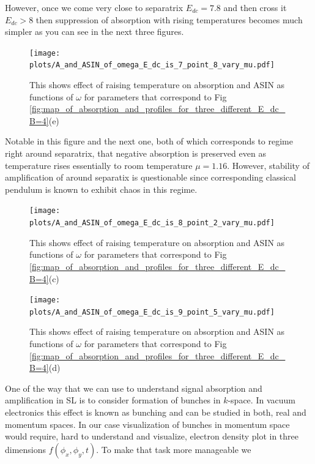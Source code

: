 \documentclass[40pt,letterpaper,physrev]{article}
\begin{document}
    However, once we come very close to separatrix $E_{dc} = 7.8$ and then cross it $E_{dc} > 8$ then suppression of
    absorption with rising temperatures becomes much simpler as you can see in the next three figures.
	\begin{figure}[H]
	  \centering
	  \normalsize %
	  \texttt{[image: plots/A\_and\_ASIN\_of\_omega\_E\_dc\_is\_7\_point\_8\_vary\_mu.pdf]}
	  \caption{This shows effect of raising temperature on absorption and ASIN as functions of $\omega$ for parameters
	  that correspond to Fig \ref{fig:map_of_absorption_and_profiles_for_three_different_E_dc_B=4}(e)}
	  \label{fig:E_dc=7.8_B=4_different_mu}	  
	\end{figure}
	Notable in this figure and the next one, both of which corresponds to regime right around separatrix, that negative
	absorption is preserved even as temperature rises essentially to room temperature $\mu = 1.16$. However, stability of
	amplification of around separatix is questionable since corresponding classical pendulum is known to exhibit chaos in
	this regime.
	\begin{figure}[H]
	  \centering
	  \normalsize %
	  \texttt{[image: plots/A\_and\_ASIN\_of\_omega\_E\_dc\_is\_8\_point\_2\_vary\_mu.pdf]}
	  \caption{This shows effect of raising temperature on absorption and ASIN as functions of $\omega$ for parameters 
	  that correspond to Fig \ref{fig:map_of_absorption_and_profiles_for_three_different_E_dc_B=4}(c)}
	  \label{fig:E_dc=8.2_B=4_different_mu}
	\end{figure}
	\begin{figure}[H]
	  \centering
	  \normalsize %
	  \texttt{[image: plots/A\_and\_ASIN\_of\_omega\_E\_dc\_is\_9\_point\_5\_vary\_mu.pdf]}
	  \caption{This shows effect of raising temperature on absorption and ASIN as functions of $\omega$ for parameters 
	  that correspond to Fig \ref{fig:map_of_absorption_and_profiles_for_three_different_E_dc_B=4}(d)}
	  \label{fig:E_dc=9.5_B=4_different_mu}	  
	\end{figure}
    One of the way that we can use to understand signal absorption and amplification in SL is to consider formation
    of bunches in $k$-space. In vacuum electronics this effect is known as bunching and can be studied in both, real and
    momentum spaces. In our case visualization of bunches in momentum space would require, hard to understand and
    visualize, electron density plot in three dimensions $f(\phi_x, \phi_y, t)$. To make that task more manageable we
\end{document}
